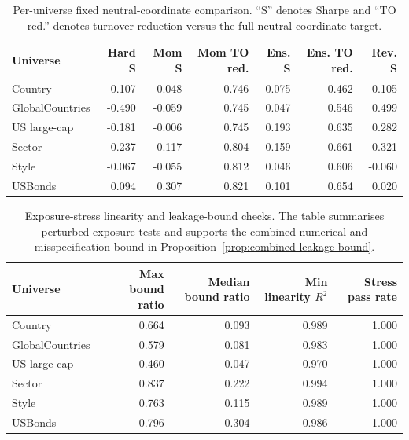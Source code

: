 \documentclass[11pt]{article}
\begin{document}
\begin{table}[!htbp]
\centering
\scriptsize
\begin{tabular}{lrrrrrr}
\toprule
Universe & Hard S & Mom S & Mom TO red. & Ens. S & Ens. TO red. & Rev. S \\
\midrule
Country & -0.107 & 0.048 & 0.746 & 0.075 & 0.462 & 0.105 \\
GlobalCountries & -0.490 & -0.059 & 0.745 & 0.047 & 0.546 & 0.499 \\
US large-cap & -0.181 & -0.006 & 0.745 & 0.193 & 0.635 & 0.282 \\
Sector & -0.237 & 0.117 & 0.804 & 0.159 & 0.661 & 0.321 \\
Style & -0.067 & -0.055 & 0.812 & 0.046 & 0.606 & -0.060 \\
USBonds & 0.094 & 0.307 & 0.821 & 0.101 & 0.654 & 0.020 \\
\bottomrule
\end{tabular}
\caption{Per-universe fixed neutral-coordinate comparison.  ``S'' denotes Sharpe and ``TO red.'' denotes turnover reduction versus the full neutral-coordinate target.}
\label{tab:per-universe}
\end{table}

\begin{table}[!htbp]
\centering
\small
\begin{tabular}{lrrrr}
\toprule
Universe & Max bound ratio & Median bound ratio & Min linearity $R^2$ & Stress pass rate \\
\midrule
Country & 0.664 & 0.093 & 0.989 & 1.000 \\
GlobalCountries & 0.579 & 0.081 & 0.983 & 1.000 \\
US large-cap & 0.460 & 0.047 & 0.970 & 1.000 \\
Sector & 0.837 & 0.222 & 0.994 & 1.000 \\
Style & 0.763 & 0.115 & 0.989 & 1.000 \\
USBonds & 0.796 & 0.304 & 0.986 & 1.000 \\
\bottomrule
\end{tabular}
\caption{Exposure-stress linearity and leakage-bound checks.  The table summarises perturbed-exposure tests and supports the combined numerical and misspecification bound in Proposition~\ref{prop:combined-leakage-bound}.}
\label{tab:exposure-stress}
\end{table}
\end{document}
